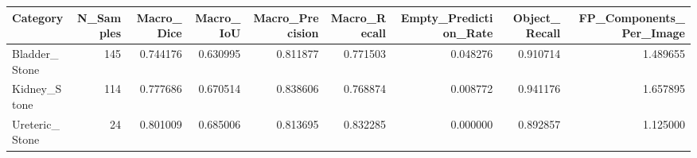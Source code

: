 \begin{tabular}{lrrrrrrrr}
\toprule
Category & N_Samples & Macro_Dice & Macro_IoU & Macro_Precision & Macro_Recall & Empty_Prediction_Rate & Object_Recall & FP_Components_Per_Image \\
\midrule
Bladder_Stone & 145 & 0.744176 & 0.630995 & 0.811877 & 0.771503 & 0.048276 & 0.910714 & 1.489655 \\
Kidney_Stone & 114 & 0.777686 & 0.670514 & 0.838606 & 0.768874 & 0.008772 & 0.941176 & 1.657895 \\
Ureteric_Stone & 24 & 0.801009 & 0.685006 & 0.813695 & 0.832285 & 0.000000 & 0.892857 & 1.125000 \\
\bottomrule
\end{tabular}
